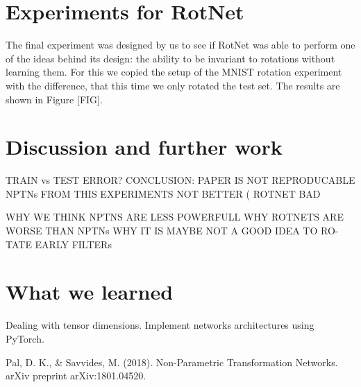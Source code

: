 \documentclass{llncs}
\begin{document}
\section{Experiments for RotNet}
The final experiment was designed by us to see if RotNet was able to perform one of the ideas behind its design: the ability to be invariant to rotations without learning them. For this we copied the setup of the MNIST rotation experiment with the difference, that this time we only rotated the test set. The results are shown in Figure [FIG]. 


\section{Discussion and further work}
TRAIN vs TEST ERROR?
CONCLUSION: PAPER IS NOT REPRODUCABLE NPTNs FROM THIS
EXPERIMENTS NOT BETTER ( ROTNET BAD

WHY WE THINK NPTNS ARE LESS POWERFULL WHY ROTNETS ARE
WORSE THAN NPTNs WHY IT IS MAYBE NOT A GOOD IDEA TO RO-
TATE EARLY FILTERs

\section{What we learned}
Dealing with tensor dimensions.
Implement networks architectures using PyTorch.

%
%
\begin{thebibliography}{}
%
Pal, D. K., \& Savvides, M. (2018). Non-Parametric Transformation Networks. arXiv preprint arXiv:1801.04520.


%
%


\end{thebibliography}
%
\end{document}
